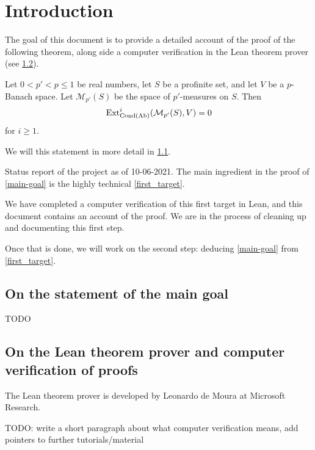 \section{Introduction}
\label{intro}

The goal of this document is to provide a detailed account
of the proof of the following theorem,
along side a computer verification in the Lean theorem prover
(see \cref{on-lean}).

\begin{theorem}
  \label{main-goal}
  Let $0 < p' < p \le 1$ be real numbers,
  let $S$ be a profinite set,
  and let $V$ be a $p$-Banach space.
  Let $\mathcal M_{p'}(S)$ be the space of $p'$-measures on $S$.
  Then
  \[
    \operatorname{Ext}^i_{\operatorname{Cond}(\operatorname{Ab})}(\mathcal M_{p'}(S), V)=0
  \]
  for $i \ge 1$.
\end{theorem}

We will this statement in more detail in \cref{on-the-statement}.

\begin{remark}
  Status report of the project as of 10-06-2021.
  The main ingredient in the proof of \cref{main-goal}
  is the highly technical \cref{first_target}.

  We have completed a computer verification of this first target in Lean,
  and this document contains an account of the proof.
  We are in the process of cleaning up and documenting this first step.

  Once that is done, we will work on the second step:
  deducing \cref{main-goal} from \cref{first_target}.
\end{remark}

\subsection{On the statement of the main goal}
\label{on-the-statement}

TODO

\subsection{On the Lean theorem prover and computer verification of proofs}
\label{on-lean}

The Lean theorem prover is developed by Leonardo de Moura
at Microsoft Research.

TODO: write a short paragraph about what computer verification means,
add pointers to further tutorials/material

